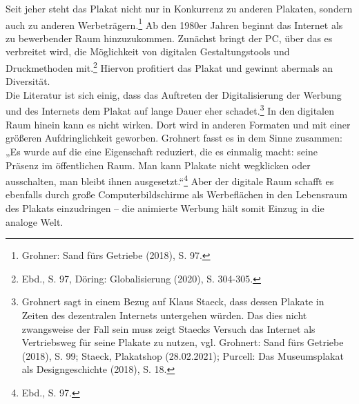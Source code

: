 \documentclass[a4paper,12pt,ngerman]{article}
\begin{document}
Seit jeher steht das Plakat nicht nur in Konkurrenz zu anderen Plakaten, sondern auch zu anderen Werbeträgern.\footnote{Grohner: Sand fürs Getriebe (2018), S. 97.}  Ab den 1980er Jahren beginnt das Internet als zu bewerbender Raum hinzuzukommen. Zunächst bringt der PC, über das es verbreitet wird, die Möglichkeit von digitalen Gestaltungstools und Druckmethoden mit.\footnote{Ebd., S. 97, Döring: Globalisierung (2020), S. 304-305.}  Hiervon profitiert das Plakat und gewinnt abermals an Diversität. \\
Die Literatur ist sich einig, dass das Auftreten der Digitalisierung der Werbung und des Internets dem Plakat auf lange Dauer eher schadet.\footnote{Grohnert sagt in einem Bezug auf Klaus Staeck, dass dessen Plakate in Zeiten des dezentralen Internets untergehen würden. Das dies nicht zwangsweise der Fall sein muss zeigt Staecks Versuch das Internet als Vertriebsweg für seine Plakate zu nutzen, vgl. Grohnert: Sand fürs Getriebe (2018), S. 99; Staeck, Plakatshop (28.02.2021); Purcell: Das Museumsplakat als Designgeschichte (2018), S. 18.}  In den digitalen Raum hinein kann es nicht wirken. Dort wird in anderen Formaten und mit einer größeren Aufdringlichkeit geworben. Grohnert fasst es in dem Sinne zusammen: „Es wurde auf die eine Eigenschaft reduziert, die es einmalig macht: seine Präsenz im öffentlichen Raum. Man kann Plakate nicht wegklicken oder ausschalten, man bleibt ihnen ausgesetzt.“\footnote{Ebd., S. 97.}  Aber der digitale Raum schafft es ebenfalls durch große Computerbildschirme als Werbeflächen in den Lebensraum des Plakats einzudringen -- die animierte Werbung hält somit Einzug in die analoge Welt. \\
\end{document}
